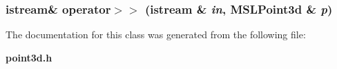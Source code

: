 \subsubsection{\setlength{\rightskip}{0pt plus 5cm}istream\& operator$>$$>$ (istream \& {\em in}, MSLPoint3d \& {\em p})\hspace{0.3cm}{\tt  [friend]}}\label{class_MSLPoint3d_l1}




The documentation for this class was generated from the following file:\begin{CompactItemize}
\item 
{\bf point3d.h}\end{CompactItemize}
